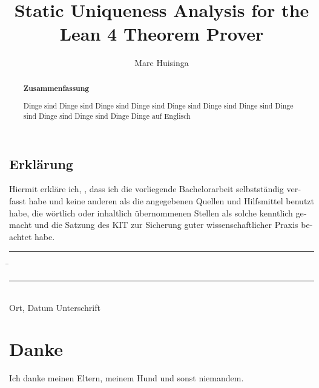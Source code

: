 \documentclass[parskip=full,12pt,a4paper,twoside,headings=openright]{scrreprt}
\title{Static Uniqueness Analysis for the Lean 4 Theorem Prover}
\author{Marc Huisinga}
\begin{document}
\begin{otherlanguage}{ngerman} %
\mytitlepage
\end{otherlanguage}

\begin{abstract}
\begin{center}\Huge\textbf{\textsf{Zusammenfassung}}
\end{center}
\vfill

Dinge sind Dinge sind Dinge sind Dinge sind Dinge sind Dinge sind Dinge sind Dinge sind Dinge sind Dinge sind Dinge
\vfill
Dinge auf Englisch
\vfill
\end{abstract}

\tableofcontents














\begin{otherlanguage}{ngerman}
\chapter*{Erklärung}
\pagestyle{empty}

  \vspace{20mm}
  Hiermit erkläre ich, \theauthor, dass ich die vorliegende Bachelorarbeit selbst\-ständig
verfasst habe und keine anderen als die angegebenen Quellen und Hilfsmittel
benutzt habe, die wörtlich oder inhaltlich übernommenen Stellen als solche kenntlich gemacht und
die Satzung des KIT zur Sicherung guter wissenschaftlicher Praxis beachtet habe.
  \vspace{20mm}
  \begin{tabbing}
  \rule{7cm}{.4pt}\hspace{1cm} \= \rule{6.8cm}{.4pt} \\
 Ort, Datum \> Unterschrift
  \end{tabbing}
\end{otherlanguage}

\chapter*{Danke}
\pagestyle{empty}

Ich danke meinen Eltern, meinem Hund und sonst niemandem.

\pagestyle{fancy}
\appendix


\end{document}
